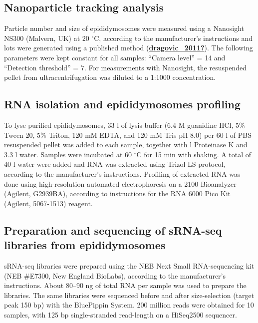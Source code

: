 \documentclass[12pt,twoside]{reedthesis}
\begin{document}
\hypertarget{nanoparticle-tracking-analysis}{%
\subsection{Nanoparticle tracking analysis}\label{nanoparticle-tracking-analysis}}

Particle number and size of epididymosomes were measured using a
Nanosight NS300 (Malvern, UK) at 20 \(^{\circ}\)C, according to the
manufacturer's instructions and lots were generated using a published
method (\protect\hyperlink{ref-dragovic_2011}{\textbf{dragovic\_2011?}}). The following parameters were kept constant for
all samples: ``Camera level'' = 14 and ``Detection threshold'' = 7. For
measurements with Nanosight, the resuspended pellet from
ultracentrifugation was diluted to a 1:1000 concentration.

\hypertarget{rna-isolation-and-epididymosomes-profiling}{%
\subsection{RNA isolation and epididymosomes profiling}\label{rna-isolation-and-epididymosomes-profiling}}

To lyse purified epididymosomes, 33 \textmu l of lysis buffer (6.4 M
guanidine HCl, 5\% Tween 20, 5\% Triton, 120 mM EDTA, and 120 mM Tris pH
8.0) per 60 \textmu l of PBS resuspended pellet was added to each
sample, together with \textmu l Proteinase K and 3.3 \textmu l water.
Samples were incubated at 60 \(^{\circ}\)C for 15 min with shaking. A
total of 40 \textmu l water were added and RNA was extracted using
Trizol LS protocol, according to the manufacturer's instructions.
Profiling of extracted RNA was done using high-resolution automated
electrophoresis on a 2100 Bioanalyzer (Agilent, G2939BA), according to
instructions for the RNA 6000 Pico Kit (Agilent, 5067-1513) reagent.

\hypertarget{preparation-and-sequencing-of-srna-seq-libraries-from-epididymosomes}{%
\subsection{Preparation and sequencing of sRNA-seq libraries from epididymosomes}\label{preparation-and-sequencing-of-srna-seq-libraries-from-epididymosomes}}

sRNA-seq libraries were prepared using the NEB Next Small RNA-sequencing
kit (NEB \#E7300, New England BioLabs), according to the manufacturer's
instructions. About 80--90 ng of total RNA per sample was used to
prepare the libraries. The same libraries were sequenced before and
after size-selection (target peak 150 bp) with the BluePippin System.
200 million reads were obtained for 10 samples, with 125 bp
single-stranded read-length on a HiSeq2500 sequencer.
\end{document}
